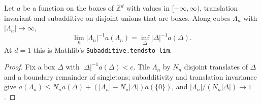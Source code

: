 \begin{lemma}[Georgii (15.11)]
    \label{lem:ent-1511}
    \leanok

    Let $a$ be a function on the boxes of $\mathbb{Z}^d$ with values in $[-\infty, \infty)$,
    translation invariant and subadditive on disjoint unions that are boxes. Along cubes
    $\Lambda_n$ with $|\Lambda_n| \to \infty$,
    \[ \lim_n |\Lambda_n|^{-1} a(\Lambda_n) = \inf_\Delta |\Delta|^{-1} a(\Delta). \]
    At $d = 1$ this is Mathlib's \texttt{Subadditive.tendsto\_lim}.
\end{lemma}
\begin{proof}
    \leanok

    Fix a box $\Delta$ with $|\Delta|^{-1}a(\Delta) < c$. Tile $\Lambda_n$ by $N_n$ disjoint
    translates of $\Delta$ and a boundary remainder of singletons; subadditivity and
    translation invariance give $a(\Lambda_n) \le N_n a(\Delta) + (|\Lambda_n| - N_n|\Delta|)a(\{0\})$,
    and $|\Lambda_n|/(N_n|\Delta|) \to 1$.
\end{proof}

